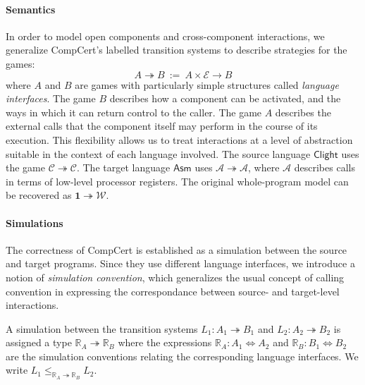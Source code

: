 \documentclass[sigplan,10pt,review,anonymous]{acmart}
\newcommand{\kw}[1]{\ensuremath{ \mathsf{#1} }}
\begin{document}
\paragraph{Semantics} %

In order to model open components and cross-component interactions,
we generalize CompCert's labelled transition systems
to describe strategies for the games:
\[ A \twoheadrightarrow B \: := \:
   A \times \mathcal{E} \rightarrow B \]
where $A$ and $B$ are games with particularly simple structures
called \emph{language interfaces}.
The game $B$ describes how a component can be activated,
and the ways in which it can return control to the caller.
The game $A$ describes the external calls that the component itself
may perform in the course of its execution.
This flexibility allows us to treat interactions
at a level of abstraction suitable in the context of each language involved.
The source language \kw{Clight} uses the game
$\mathcal{C} \twoheadrightarrow \mathcal{C}$.
The target language \kw{Asm} uses
$\mathcal{A} \twoheadrightarrow \mathcal{A}$,
where $\mathcal{A}$ describes calls
in terms of low-level processor registers.
The original whole-program model can be recovered as
$\mathbf{1} \twoheadrightarrow \mathcal{W}$.



\paragraph{Simulations} %

The correctness of CompCert is established as
a simulation between the source and target programs.
Since they use different language interfaces,
we introduce a notion of \emph{simulation convention},
which generalizes the usual concept of calling convention
in expressing the correspondance between
source- and target-level interactions.

A simulation between the transition systems
$L_1 : A_1 \twoheadrightarrow B_1$ and
$L_2 : A_2 \twoheadrightarrow B_2$
is assigned a type $\mathbb{R}_A \twoheadrightarrow \mathbb{R}_B$
where the expressions
$\mathbb{R}_A : A_1 \Leftrightarrow A_2$ and
$\mathbb{R}_B : B_1 \Leftrightarrow B_2$
are the simulation conventions
relating the corresponding language interfaces.
We write
$L_1 \le_{\mathbb{R}_A \twoheadrightarrow \mathbb{R}_B} L_2$.
\end{document}
